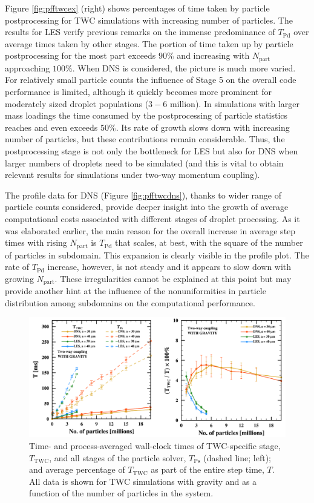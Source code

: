 \documentclass{pracamgren}
\begin{document}
Figure \ref{fig:pfftwcex} (right) shows percentages of time taken by particle postprocessing for TWC simulations with increasing number of particles.
The results for LES verify previous remarks on the immense predominance of $T_{\text{Pd}}$ over average times taken by other stages.
The portion of time taken up by particle postprocessing for the most part exceeds $90 \%$ and increasing with $N_{\text{part}}$ approaching $100 \%$.
When DNS is considered, the picture is much more varied.
For relatively small particle counts the influence of Stage 5 on the overall code performance is limited, although it quickly becomes more prominent for moderately sized droplet populations ($3-6$ million).
In simulations with larger mass loadings the time consumed by the postprocessing of particle statistics reaches and even exceeds $50 \%$.
Its rate of growth slows down with increasing number of particles, but these contributions remain considerable.
Thus, the postprocessing stage is not only the bottleneck for LES but also for DNS when larger numbers of droplets need to be simulated (and this is vital to obtain relevant results for simulations under two-way momentum coupling).  

The profile data for DNS (Figure \ref{fig:pfftwcdns}), thanks to wider range of particle counts considered, provide deeper insight into the growth of average computational costs associated with different stages of droplet processing.
As it was elaborated earlier, the main reason for the overall increase in average step times with rising $N_{\text{part}}$ is $T_{\text{Pd}}$ that scales, at best, with the square of the number of particles in subdomain.
This expansion is clearly visible in the profile plot.
The rate of $T_{\text{Pd}}$ increase, however, is not steady and it appears to slow down with growing $N_{\text{part}}$.
These irregularities cannot be explained at this point but may provide another hint at the influence of the nonuniformities in particle distribution among subdomains on the computational performance.

\begin{figure}[ht]
\centering
\includegraphics[width=13.5cm]{figures/3-11_pfftwctwc.pdf}
\caption{
Time- and process-averaged wall-clock times of TWC-specific stage, $T_{\text{TWC}}$, and all stages of the particle solver, $T_{\text{Ps}}$ (dashed line; left); and average percentage of $T_{\text{TWC}}$ as part of the entire step time, $T$.
All data is shown for TWC simulations with gravity and as a function of the number of particles in the system.
}
\label{fig:pfftwctwc}
\end{figure}
\end{document}
